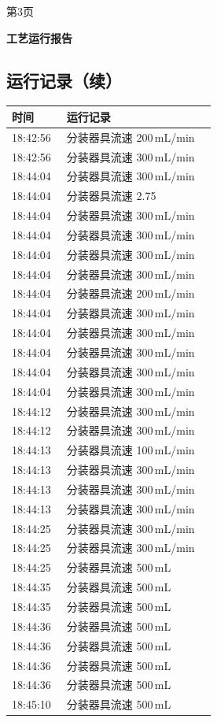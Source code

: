 \documentclass[UTF8,10pt,a4paper,fontset=fandol]{ctexart}
\begin{document}
\begin{center}
\begin{minipage}[t]{0.47\linewidth}
\vfill
第3页
\end{minipage}
\hfill
\begin{minipage}[t]{0.47\linewidth}
\centering
\textbf{工艺运行报告}

\subsection*{运行记录（续）}

\begin{tabular}{|p{0.25\linewidth}|p{0.68\linewidth}|}
\hline
时间 & 运行记录 \\ \hline
18:42:56 & 分装器具流速 200\,mL/min \\ \hline
18:42:56 & 分装器具流速 300\,mL/min \\ \hline
18:44:04 & 分装器具流速 300\,mL/min \\ \hline
18:44:04 & 分装器具流速 2.75 \\ \hline
18:44:04 & 分装器具流速 300\,mL/min \\ \hline
18:44:04 & 分装器具流速 300\,mL/min \\ \hline
18:44:04 & 分装器具流速 300\,mL/min \\ \hline
18:44:04 & 分装器具流速 300\,mL/min \\ \hline
18:44:04 & 分装器具流速 200\,mL/min \\ \hline
18:44:04 & 分装器具流速 300\,mL/min \\ \hline
18:44:04 & 分装器具流速 300\,mL/min \\ \hline
18:44:04 & 分装器具流速 300\,mL/min \\ \hline
18:44:04 & 分装器具流速 300\,mL/min \\ \hline
18:44:04 & 分装器具流速 300\,mL/min \\ \hline
18:44:12 & 分装器具流速 300\,mL/min \\ \hline
18:44:12 & 分装器具流速 300\,mL/min \\ \hline
18:44:13 & 分装器具流速 100\,mL/min \\ \hline
18:44:13 & 分装器具流速 300\,mL/min \\ \hline
18:44:13 & 分装器具流速 300\,mL/min \\ \hline
18:44:13 & 分装器具流速 300\,mL/min \\ \hline
18:44:25 & 分装器具流速 300\,mL/min \\ \hline
18:44:25 & 分装器具流速 300\,mL/min \\ \hline
18:44:25 & 分装器具流速 500\,mL \\ \hline
18:44:35 & 分装器具流速 500\,mL \\ \hline
18:44:35 & 分装器具流速 500\,mL \\ \hline
18:44:36 & 分装器具流速 500\,mL \\ \hline
18:44:36 & 分装器具流速 500\,mL \\ \hline
18:44:36 & 分装器具流速 500\,mL \\ \hline
18:44:36 & 分装器具流速 500\,mL \\ \hline
18:45:10 & 分装器具流速 500\,mL \\ \hline
\end{tabular}


\end{minipage}
\end{center}
\end{document}
